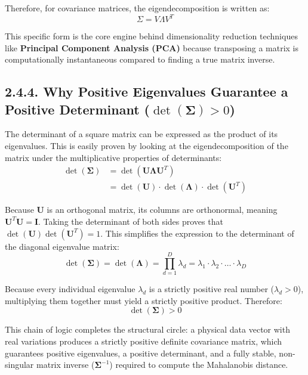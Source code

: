 \documentclass{article}
\begin{document}
Therefore, for covariance matrices, the eigendecomposition is written as:
\[ \Sigma = V \Lambda V^T \]

This specific form is the core engine behind dimensionality reduction techniques like \textbf{Principal Component Analysis (PCA)} because transposing a matrix is computationally instantaneous compared to finding a true matrix inverse.

\subsection*{2.4.4. Why Positive Eigenvalues Guarantee a Positive Determinant ($\det(\boldsymbol{\Sigma}) > 0$)}

The determinant of a square matrix can be expressed as the product of its eigenvalues. This is easily proven by looking at the eigendecomposition of the matrix under the multiplicative properties of determinants:
\begin{align*}
\det(\boldsymbol{\Sigma}) &= \det(\mathbf{U} \boldsymbol{\Lambda} \mathbf{U}^T) \\
&= \det(\mathbf{U}) \cdot \det(\boldsymbol{\Lambda}) \cdot \det(\mathbf{U}^T)
\end{align*}

Because $\mathbf{U}$ is an orthogonal matrix, its columns are orthonormal, meaning $\mathbf{U}^T \mathbf{U} = \mathbf{I}$. Taking the determinant of both sides proves that $\det(\mathbf{U})\det(\mathbf{U}^T) = 1$. This simplifies the expression to the determinant of the diagonal eigenvalue matrix:
\begin{equation*}
\det(\boldsymbol{\Sigma}) = \det(\boldsymbol{\Lambda}) = \prod_{d=1}^D \lambda_d = \lambda_1 \cdot \lambda_2 \cdot \dots \cdot \lambda_D
\end{equation*}

Because every individual eigenvalue $\lambda_d$ is a strictly positive real number ($\lambda_d > 0$), multiplying them together must yield a strictly positive product. Therefore:
\begin{equation*}
\det(\boldsymbol{\Sigma}) > 0
\end{equation*}

This chain of logic completes the structural circle: a physical data vector with real variations produces a strictly positive definite covariance matrix, which guarantees positive eigenvalues, a positive determinant, and a fully stable, non-singular matrix inverse ($\boldsymbol{\Sigma}^{-1}$) required to compute the Mahalanobis distance.
\end{document}
